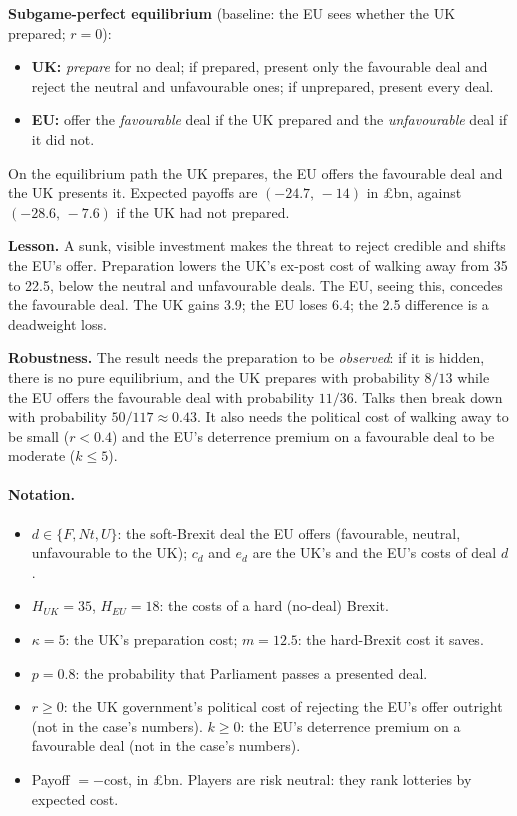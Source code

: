 \documentclass[11pt,a4paper]{article}
\newcommand{\gbp}{\pounds}
\newcommand{\Nt}{\mathit{Nt}}
\newcommand{\dF}{\mathit{F}}
\newcommand{\dU}{\mathit{U}}
\begin{document}
\begin{tcolorbox}[colback=ans!5,colframe=ans,boxrule=0.8pt,title={Executive summary}]
\textbf{Subgame-perfect equilibrium} (baseline: the EU sees whether the UK prepared; $r=0$):
\begin{itemize}[leftmargin=1.4em]
  \item \textbf{UK:} \emph{prepare} for no deal; if prepared, present only the favourable deal
    and reject the neutral and unfavourable ones; if unprepared, present every deal.
  \item \textbf{EU:} offer the \emph{favourable} deal if the UK prepared and the
    \emph{unfavourable} deal if it did not.
\end{itemize}
On the equilibrium path the UK prepares, the EU offers the favourable deal and the UK presents
it. Expected payoffs are $(-24.7,\,-14)$ in \gbp bn, against $(-28.6,\,-7.6)$ if the UK had not
prepared.

\textbf{Lesson.} A sunk, visible investment makes the threat to reject credible and shifts the
EU's offer. Preparation lowers the UK's ex-post cost of walking away from 35 to 22.5, below the
neutral and unfavourable deals. The EU, seeing this, concedes the favourable deal. The UK gains
3.9; the EU loses 6.4; the 2.5 difference is a deadweight loss.

\textbf{Robustness.} The result needs the preparation to be \emph{observed}: if it is hidden,
there is no pure equilibrium, and the UK prepares with probability $8/13$ while the EU offers the
favourable deal with probability $11/36$. Talks then break down with probability $50/117\approx0.43$.
It also needs the political cost of walking away to be small ($r<0.4$) and the EU's
deterrence premium on a favourable deal to be moderate ($k\le5$).
\end{tcolorbox}

\paragraph{Notation.}
\begin{itemize}[leftmargin=1.4em,topsep=1pt,itemsep=0pt]\small
  \item $d\in\{\dF,\Nt,\dU\}$: the soft-Brexit deal the EU offers (favourable, neutral,
    unfavourable to the UK); $c_d$ and $e_d$ are the UK's and the EU's costs of deal $d$.
  \item $H_{UK}=35$, $H_{EU}=18$: the costs of a hard (no-deal) Brexit.
  \item $\kappa=5$: the UK's preparation cost; $m=12.5$: the hard-Brexit cost it saves.
  \item $p=0.8$: the probability that Parliament passes a presented deal.
  \item $r\ge0$: the UK government's political cost of rejecting the EU's offer outright (not in
    the case's numbers). $k\ge0$: the EU's deterrence premium on a favourable deal (not in the case's
    numbers).
  \item Payoff $=-$cost, in \gbp bn. Players are risk neutral: they rank lotteries by expected
    cost.
\end{itemize}
\end{document}
